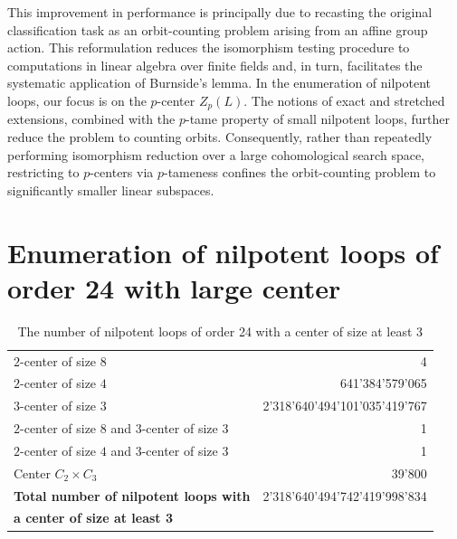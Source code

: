 \documentclass[12pt,a4paper]{amsart}
\theoremstyle{definition}
\begin{document}
This improvement in performance is principally due to recasting the original classification task as an orbit-counting problem arising from an affine group action. This reformulation reduces the isomorphism testing procedure to computations in linear algebra over finite fields and, in turn, facilitates the systematic application of Burnside’s lemma. In the enumeration of nilpotent loops, our focus is on the $p$-center $Z_p(L)$. The notions of exact and stretched extensions, combined with the $p$-tame property of small nilpotent loops, further reduce the problem to counting orbits. Consequently, rather than repeatedly performing isomorphism reduction over a large cohomological search space, restricting to $p$-centers via $p$-tameness confines the orbit-counting problem to significantly smaller linear subspaces.





\section{Enumeration of nilpotent loops of order 24 with large center}



\begin{table}
\caption{The number of nilpotent loops of order 24 with a center of size at least 3 \label{tab:order-24}}
\scriptsize
\begin{tabular}{p{8cm}r}
$2$-center of size $8$ & 4 \\ 
$2$-center of size $4$ & 641'384'579'065 \\ 
$3$-center of size $3$ & 2'318'640'494'101'035'419'767 \\ 
\hline
$2$-center of size $8$ and $3$-center of size 3 & 1 \\ 
$2$-center of size $4$ and $3$-center of size 3 & 1 \\ 
Center $C_2\times C_3$ & 39'800 \\ 
\hline\hline
\textbf{Total number of nilpotent loops with} & 2'318'640'494'742'419'998'834 \\ 
\textbf{a center of size at least 3} & 
\end{tabular}
\end{table}
\end{document}
